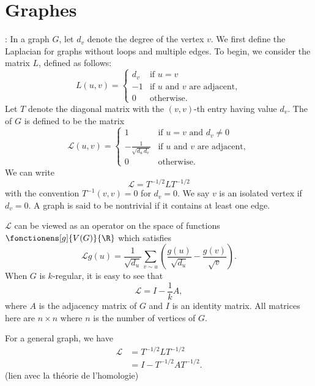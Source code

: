 \section{Graphes}

\cite[Sec. 1.2]{chung_lectures_nodate} : In a graph $G$, let $d_v$ denote the degree of the vertex $v$. We first define the Laplacian for graphs without loops and multiple edges. To begin, we consider the matrix $L$, defined as follows:
\[
L(u,v) = \begin{cases}
    d_v &\text{if } u = v \\
    -1 &\text{if $u$ and $v$ are adjacent}, \\
    0 & \text{otherwise}.
\end{cases}
\]
Let $T$ denote the diagonal matrix with the $(v,v)$-th entry having value $d_v$. The  of $G$ is defined to be the matrix
\[
\mathcal{L}(u,v) = \begin{cases}
    1 & \text{if $u = v$ and $d_v \not= 0$} \\
    - \frac{1}{\sqrt{d_u \, d_v}} & \text{if $u$ and $v$ are adjacent}, \\
    0 & \text{otherwise}. 
\end{cases}
\]
We can write
\[
\mathcal{L} = T^{-1/2} L T^{-1/2}
\]
with the convention $T^{-1}(v,v) = 0$ for $d_v = 0$. We say $v$ is an isolated vertex if $d_v = 0$. A graph is said to be nontrivial if it contains at least one edge. 

$\mathcal{L}$ can be viewed as an operator on the space of functions $\fonctionens[g]{V(G)}{\R}$ which satisfies
\[
\mathcal{L}g(u) = \frac{1}{\sqrt{d_u}} \sum_{v \sim u} \left( \frac{g(u)}{\sqrt{d_u}} - \frac{g(v)}{\sqrt{v}} \right).
\]
When $G$ is $k$-regular, it is easy to see that
\[
\mathcal{L} = I - \frac{1}{k} A,
\]
where $A$ is the adjacency matrix of $G$ and $I$ is an identity matrix. All matrices here are $n \times n$ where $n$ is the number of vertices of $G$. 

For a general graph, we have
\begin{align*}
    \mathcal{L} &= T^{-1/2} L T^{-1/2} \\
    &= I - T^{-1/2} A T^{-1/2}.
\end{align*}
(lien avec la théorie de l'homologie)

